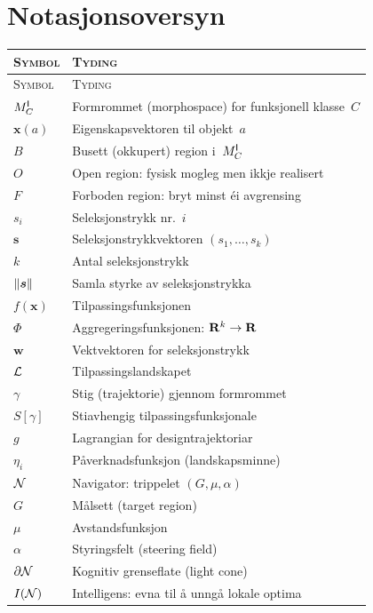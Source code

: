 \chapter{Notasjonsoversyn}
\label{app:notasjon}

{\small
\begin{longtable}{@{}p{28mm}p{62mm}@{}}
\toprule
\textsc{Symbol} & \textsc{Tyding} \\
\midrule
\endfirsthead
\toprule
\textsc{Symbol} & \textsc{Tyding} \\
\midrule
\endhead
\bottomrule
\endfoot

$M^{\mathsf{I}}_C$ & Formrommet (morphospace) for funksjonell klasse~$C$ \\
$\bm{x}(a)$ & Eigenskapsvektoren til objekt~$a$ \\
$B$ & Busett (okkupert) region i~$M^{\mathsf{I}}_C$ \\
$O$ & Open region: fysisk mogleg men ikkje realisert \\
$F$ & Forboden region: bryt minst éi avgrensing \\
\addlinespace
$s_i$ & Seleksjonstrykk nr.~$i$ \\
$\bm{s}$ & Seleksjonstrykkvektoren $(s_1, \ldots, s_k)$ \\
$k$ & Antal seleksjonstrykk \\
$\lVert \bm{s} \rVert$ & Samla styrke av seleksjonstrykka \\
\addlinespace
$f(\bm{x})$ & Tilpassingsfunksjonen \\
$\Phi$ & Aggregeringsfunksjonen: $\mathbf{R}^k \to \mathbf{R}$ \\
$\bm{w}$ & Vektvektoren for seleksjonstrykk \\
$\mathcal{L}$ & Tilpassingslandskapet \\
\addlinespace
$\gamma$ & Stig (trajektorie) gjennom formrommet \\
$S[\gamma]$ & Stiavhengig tilpassingsfunksjonale \\
$g$ & Lagrangian for designtrajektoriar \\
$\eta_i$ & Påverknadsfunksjon (landskapsminne) \\
\addlinespace
$\mathcal{N}$ & Navigator: trippelet $(G, \mu, \alpha)$ \\
$G$ & Målsett (target region) \\
$\mu$ & Avstandsfunksjon \\
$\alpha$ & Styringsfelt (steering field) \\
$\partial \mathcal{N}$ & Kognitiv grenseflate (light cone) \\
$I(\mathcal{N})$ & Intelligens: evna til å unngå lokale optima \\

\end{longtable}}
